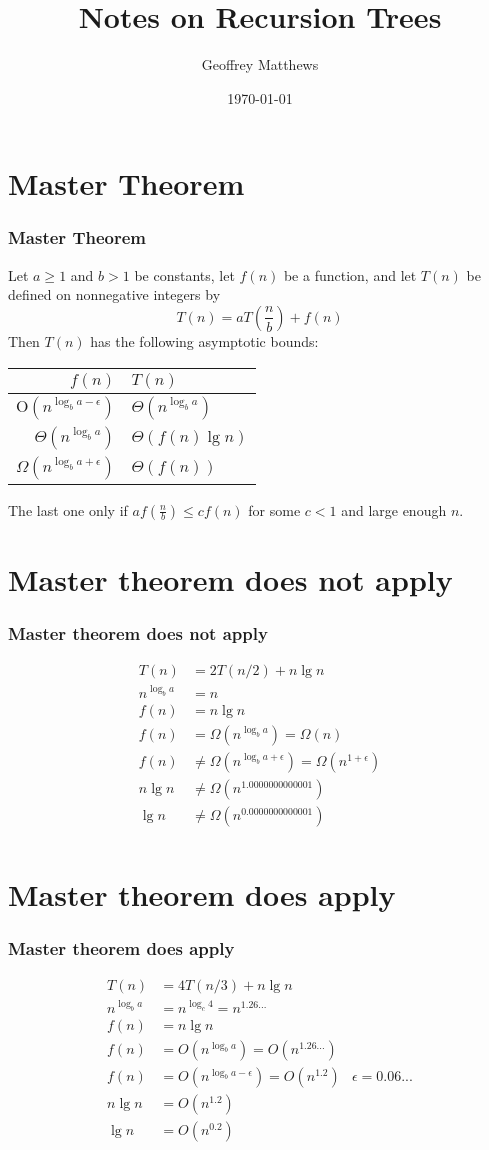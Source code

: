 \documentclass{beamer}
\title[Notes on Recursion Trees]
{
 Notes on Recursion Trees
}
\subtitle{} %
\author[Geoffrey Matthews]
{Geoffrey Matthews}
\institute[WWU/CS]
{
  Department of Computer Science\\
  Western Washington University
}
\date{\today}
\newcommand{\sect}[1]{
\section{#1}
\begin{frame}[fragile]\frametitle{#1}
}
\begin{document}


\newcommand{\myref}[1]{\small\item\url{#1}}
\newcommand{\myreft}[1]{\footnotesize\item\url{#1}}


\sect{Master Theorem}
Let $a\geq 1$ and $b > 1$ be constants, let $f(n)$ be a function, and
let $T(n)$ be defined on nonnegative integers by
\[
T(n) = aT\left(\frac{n}{b}\right) + f(n)
\]
Then $T(n)$ has the following asymptotic bounds:
\bigskip
\begin{center}
{\large
\begin{tabular}{r|l}
$f(n)$ & $T(n)$ \\\hline 
$\mbox{O}(n^{\log_b a - \epsilon})$& $ \Theta(n^{\log_b a })$\\
$\Theta(n^{\log_b a})$ & $\Theta(f(n)\lg n)$\\
$\Omega(n^{\log_b a + \epsilon})$ & $\Theta(f(n))$\\
\end{tabular}
}\end{center}
\bigskip

The last one only if $af(\frac{n}{b}) \leq cf(n)$ for some $c<1$
and large enough $n$.
\end{frame}

\sect{Master theorem does not apply}
\begin{align*}
  T(n) &= 2T(n/2) + n\lg n\\
  n^{\log_b a} &= n\\
  f(n) &= n\lg n\\
  f(n) &= \Omega(n^{\log_b a}) = \Omega(n)\\
  f(n) &\not= \Omega(n^{\log_b a+\epsilon}) = \Omega(n^{1+\epsilon})\\
n\lg n &\not= \Omega(n^{1.0000000000001})\\
\lg n &\not= \Omega(n^{0.0000000000001})\\
\end{align*}
\end{frame}

\sect{Master theorem does apply}
\begin{align*}
  T(n) &= 4T(n/3) + n\lg n\\
  n^{\log_b a} &= n^{\log_c 4} = n^{1.26...}\\
  f(n) &= n\lg n\\
  f(n) &= O(n^{\log_b a}) = O(n^{1.26...})\\
  f(n) &= O(n^{\log_b a-\epsilon}) = O(n^{1.2}) & \epsilon = 0.06...\\
  n\lg n &= O(n^{1.2})\\
  \lg n &= O(n^{0.2})\\
\end{align*}
\end{frame}
\end{document}
